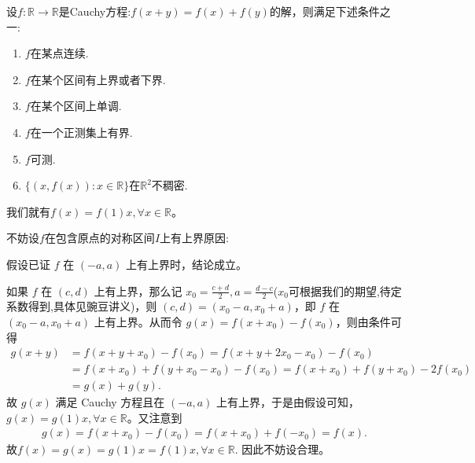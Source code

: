 \documentclass[../../main.tex]{subfiles}
\begin{document}
\begin{theorem}[Cauchy方程基本定理]\label{theorem:Cauchy方程基本定理}
设\(f:\mathbb{R}\to\mathbb{R}\)是Cauchy方程:$f(x + y)=f(x)+f(y)$的解，则满足下述条件之一:
\begin{enumerate}
\item \(f\)在某点连续.

\item  \(f\)在某个区间有上界或者下界.

\item  \(f\)在某个区间上单调.

\item  \(f\)在一个正测集上有界.

\item   \(f\)可测.

\item \(\{(x,f(x)):x\in\mathbb{R}\}\)在\(\mathbb{R}^2\)不稠密.
\end{enumerate}
我们就有\(f(x)=f(1)x,\forall x\in\mathbb{R}\)。
\end{theorem}
\begin{remark}
\hypertarget{不妨设的原因112}{不妨设\(f\)在包含原点的对称区间\(I\)上有上界原因:}假设已证 \(f\) 在 \((-a,a)\) 上有上界时，结论成立。

如果 \(f\) 在 \((c,d)\) 上有上界，那么记 \(x_0 = \frac{c + d}{2},a = \frac{d - c}{2}\)($x_0$可根据我们的期望,待定系数得到,具体见豌豆讲义)，则 \((c,d)=(x_0 - a,x_0 + a)\)，即
\(f\) 在 \((x_0 - a,x_0 + a)\) 上有上界。从而令 \(g(x)=f(x + x_0)-f(x_0)\)，则由条件可得
\begin{align*}
g(x + y)&=f(x + y + x_0)-f(x_0)
=f(x + y + 2x_0 - x_0)-f(x_0)\\
&=f(x + x_0)+f(y + x_0 - x_0)-f(x_0)
=f(x + x_0)+f(y + x_0)-2f(x_0)\\
&=g(x)+g(y).
\end{align*}
故 \(g(x)\) 满足 Cauchy 方程且在 \((-a,a)\) 上有上界，于是由假设可知，\(g(x)=g(1)x,\forall x\in \mathbb{R}\)。又注意到
\begin{align*}
g(x)=f(x+x_0)-f(x_0)=f(x+x_0)+f(-x_0)=f(x).
\end{align*}
故$f(x)=g(x)=g(1)x=f(1)x,\forall x\in\mathbb{R}.$
因此不妨设合理。
\end{remark}
\end{document}
